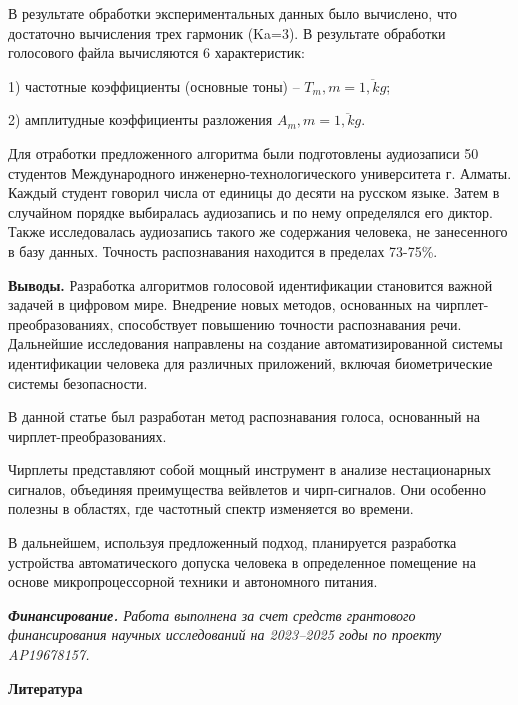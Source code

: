 \begin{multicols}{2}
В результате обработки экспериментальных данных было вычислено, что
достаточно вычисления трех гармоник (Ka=3). В результате обработки
голосового файла вычисляются 6 характеристик:

1) частотные коэффициенты (основные тоны) -- $T_m,m=\overline{1,kg}$;

2) амплитудные коэффициенты разложения $A_m,m=\overline{1,kg}$.

Для отработки предложенного алгоритма были подготовлены аудиозаписи 50
студентов Международного инженерно-технологического университета г.
Алматы. Каждый студент говорил числа от единицы до десяти на русском
языке. Затем в случайном порядке выбиралась аудиозапись и по нему
определялся его диктор. Также исследовалась аудиозапись такого же
содержания человека, не занесенного в базу данных. Точность
распознавания находится в пределах 73-75\%.

{\bfseries Выводы.} Разработка алгоритмов голосовой идентификации
становится важной задачей в цифровом мире. Внедрение новых методов,
основанных на чирплет-преобразованиях, способствует повышению точности
распознавания речи. Дальнейшие исследования направлены на создание
автоматизированной системы идентификации человека для различных
приложений, включая биометрические системы безопасности.

В данной статье был разработан метод распознавания голоса, основанный на
чирплет-преобразованиях.

Чирплеты представляют собой мощный инструмент в анализе нестационарных
сигналов, объединяя преимущества вейвлетов и чирп-сигналов. Они особенно
полезны в областях, где частотный спектр изменяется во времени.

В дальнейшем, используя предложенный подход, планируется разработка
устройства автоматического допуска человека в определенное помещение на
основе микропроцессорной техники и автономного питания.

\emph{{\bfseries Финансирование.} Работа выполнена за счет средств
грантового финансирования научных исследований на 2023--2025 годы по
проекту AP19678157.}
\end{multicols}

\begin{center}
{\bfseries Литература}
\end{center}

